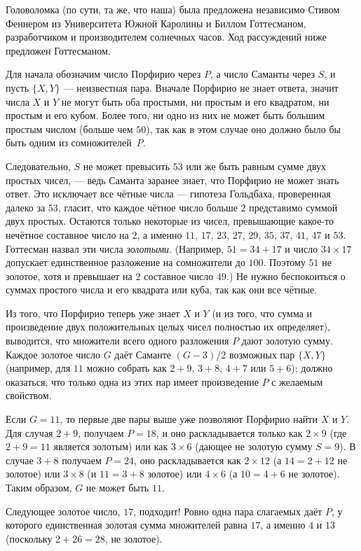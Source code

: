 Головоломка (по сути, та же, что наша) была предложена независимо Стивом Феннером из Университета Южной Каролины и Биллом Готтесманом, разработчиком и производителем солнечных часов.
Ход рассуждений ниже предложен Готтесманом.

Для начала обозначим число Порфирио через $P$, а число Саманты через $S$, и пусть $\{X, Y\}$ --- неизвестная пара.
Вначале Порфирио не знает ответа, значит числа $X$ и $Y$ не могут быть оба простыми,
ни простым и его квадратом,
ни простым и его кубом.
Более того, ни одно из них не может быть большим простым числом (больше чем $50$), так как в этом случае оно должно было бы быть одним из сомножителей~$P$.

Следовательно, $S$ не может превысить $53$ или же быть равным сумме двух простых чисел, --- ведь Саманта заранее знает, что Порфирио не может знать ответ.
Это исключает все чётные числа --- гипотеза Гольдбаха, проверенная далеко за $53$, гласит, что каждое чётное число больше $2$ представимо суммой двух простых.
Остаются только некоторые из чисел, превышающие какое-то нечётное составное число на $2$, а именно $11$, $17$, $23$, $27$, $29$, $35$, $37$, $41$, $47$ и $53$.
Готтесман назвал эти числа \emph{золотыми}.
(Например, $51=34+17$ и число $34\times 17$ допускает единственное разложение на сомножители до $100$. Поэтому $51$ не золотое, хотя и превышает на $2$ составное число $49$.)
Не нужно беспокоиться о суммах простого числа и его квадрата или куба, так как они все чётные.

Из того, что Порфирио теперь уже знает $X$ и $Y$ (и из того, что сумма и произведение двух положительных целых чисел полностью их определяет), выводится, что множители всего одного разложения $P$ дают золотую сумму. 
Каждое золотое число $G$ даёт Саманте $(G - 3)/2$ возможных пар $\{X, Y\}$
(например, для $11$ можно собрать как $2 + 9$, $3 + 8$, $4 + 7$ или $5 + 6$); должно оказаться, что только одна из этих пар имеет произведение $P$ с желаемым свойством.

Если $G = 11$, то первые две пары выше уже позволяют Порфирио найти $X$ и $Y$.
Для случая $2 + 9$, получаем $P = 18$, и оно раскладывается только как $2 \times 9$ (где $2 + 9 = 11$ является золотым) или как $3 \times 6$ (дающее не золотую сумму $S = 9$).
В случае $3 + 8$ получаем $P = 24$, оно раскладывается как $2 \times 12$ (а $14=2+12$ не золотое) или
$3 \times 8$ (и $11=3+8$ золотое) или $4 \times 6$ (а $10=4+6$ не золотое).
Таким образом, $G$ не может быть $11$.

Следующее золотое число, $17$, подходит!
Ровно одна пара слагаемых даёт $P$, у которого единственная золотая сумма множителей равна $17$, а именно $4$ и $13$ (поскольку $2 + 26 = 28$, не золотое).

